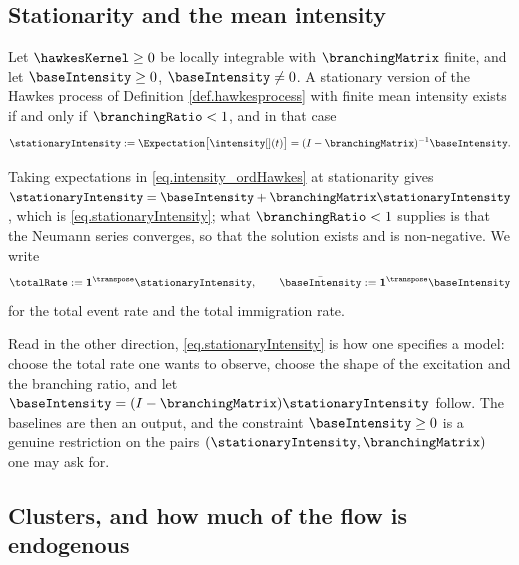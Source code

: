 \subsection{Stationarity and the mean intensity}

\begin{prop}\label{prop.stationarity}
 Let $\hawkesKernel \geq 0$ be locally integrable with $\branchingMatrix$ finite,
 and let $\baseIntensity \geq 0$, $\baseIntensity \neq 0$.
 A stationary version of the Hawkes process of Definition \ref{def.hawkesprocess}
 with finite mean intensity exists if and only if $\branchingRatio < 1$,
 and in that case
 \begin{equation}\label{eq.stationaryIntensity}
  \stationaryIntensity := \Expectation \big[ \intensity[ ](t) \big]
  = (I - \branchingMatrix)^{-1} \baseIntensity.
 \end{equation}
\end{prop}

Taking expectations in \eqref{eq.intensity_ordHawkes} at stationarity gives
$\stationaryIntensity = \baseIntensity + \branchingMatrix \stationaryIntensity$,
which is \eqref{eq.stationaryIntensity};
what $\branchingRatio<1$ supplies is that the Neumann series converges,
so that the solution exists and is non-negative.
We write
\begin{equation*}
 \totalRate := \mathbf{1}^{\transpose} \stationaryIntensity,
 \qquad
 \bar{\baseIntensity} := \mathbf{1}^{\transpose} \baseIntensity
\end{equation*}
for the total event rate and the total immigration rate.

Read in the other direction, \eqref{eq.stationaryIntensity} is how one specifies a model:
choose the total rate one wants to observe, choose the shape of the excitation and the
branching ratio, and let $\baseIntensity = (I - \branchingMatrix)\stationaryIntensity$ follow.
The baselines are then an output, and the constraint $\baseIntensity \geq 0$ is a genuine
restriction on the pairs $(\stationaryIntensity, \branchingMatrix)$ one may ask for.

\subsection{Clusters, and how much of the flow is endogenous}

